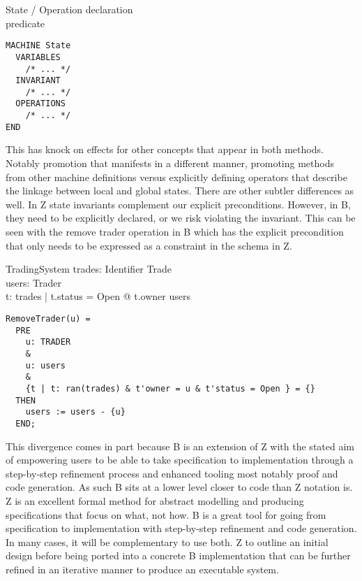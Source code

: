 \documentclass{article}
\begin{document}
\begin{schema}{State / Operation}
declaration \\
\where 
predicate \\
\end{schema}

\begin{verbatim}
MACHINE State
  VARIABLES
    /* ... */
  INVARIANT
    /* ... */
  OPERATIONS
    /* ... */
END
\end{verbatim}

\hspace{-0.68cm} This has knock on effects for other concepts that appear in both methods. Notably promotion that manifests in a different manner, promoting methods from other machine definitions versus explicitly defining operators that describe the linkage between local and global states. There are other subtler differences as well. In Z state invariants complement our explicit preconditions. However, in B, they need to be explicitly declared, or we risk violating the invariant. This can be seen with the remove trader operation in B which has the explicit precondition that only needs to be expressed as a constraint in the schema in Z.
\begin{schema}{TradingSystem}
trades: Identifier \pfun Trade \\
users: \power Trader \\
\where
\forall t: \ran trades | t.status = Open @ t.owner \in users \\ 
\end{schema}

\begin{verbatim}
RemoveTrader(u) = 
  PRE
    u: TRADER
    &
    u: users
    &
    {t | t: ran(trades) & t'owner = u & t'status = Open } = {}
  THEN
    users := users - {u}
  END;
\end{verbatim}

\hspace{-0.68cm}This divergence comes in part because B is an extension of Z with the stated aim of empowering users to be able to take specification to implementation through a step-by-step refinement process and enhanced tooling most notably proof and code generation. As such B sits at a lower level closer to code than Z notation is. \\
\newline 
\hspace{-0.68cm} Z is an excellent formal method for abstract modelling and producing specifications that focus on what, not how. B is a great tool for going from specification to implementation with step-by-step refinement and code generation. In many cases, it will be complementary to use both. Z to outline an initial design before being ported into a concrete B implementation that can be further refined in an iterative manner to produce an executable system.
\end{document}
